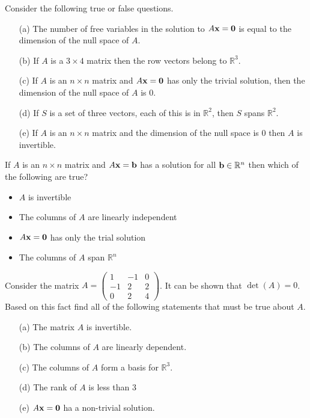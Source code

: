 \begin{problem}
    Consider the following true or false questions.
    \begin{enumerate}
        \item[(a)] The number of free variables in the solution to $A {\bf x} = {\bf 0}$ is equal
            to the dimension of the null space of $A$. 
        \item[(b)] If $A$ is a $3 \times 4$ matrix then the row vectors belong to
            $\mathbb{R}^3$. 
        \item[(c)] If $A$ is an $n \times n$ matrix and $A {\bf x} = {\bf 0}$ has only the trivial
            solution, then the dimension of the null space of $A$ is 0. 
        \item[(d)] If $S$ is a set of three vectors, each of this is in $\mathbb{R}^2$,
            then $S$ spans $\mathbb{R}^2$. 
        \item[(e)] If $A$ is an $n\times n$ matrix and the dimension of the null space is
            0 then $A$ is invertible. 
    \end{enumerate}
\end{problem}

\begin{problem}
    If $A$ is an $n \times n$ matrix and $A {\bf x} = {\bf b}$ has a solution for all ${\bf b} \in
    \mathbb{R}^n$ then which of the following are true?
    \begin{itemize}
        \item $A$ is invertible
        \item The columns of $A$ are linearly independent
        \item $A {\bf x} = {\bf 0}$ has only the trial solution
        \item The columns of $A$ span $\mathbb{R}^n$
    \end{itemize}
\end{problem}


\begin{problem}
    Consider the matrix $A = \begin{pmatrix} 1 & -1 & 0 \\ -1 & 2 & 2 \\ 0 & 2 & 4
    \end{pmatrix}$.  It can be shown that $\det(A) = 0$.  Based on this fact find all of
    the following statements that must be true about $A$.
    \begin{itemize}
        \item[(a)] The matrix $A$ is invertible.
        \item[(b)] The columns of $A$ are linearly dependent.
        \item[(c)] The columns of $A$ form a basis for $\mathbb{R}^3$.
        \item[(d)] The rank of $A$ is less than $3$
        \item[(e)] $A {\bf x} = {\bf 0}$ ha a non-trivial solution.
    \end{itemize}
\end{problem}

